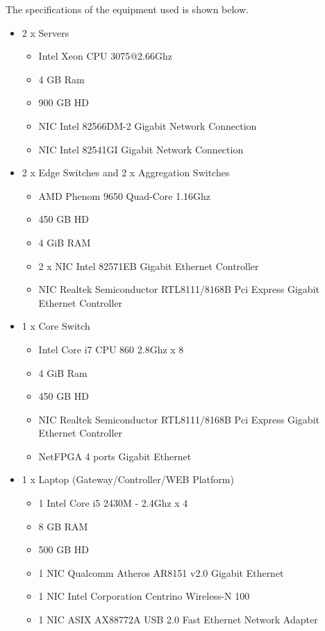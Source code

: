 \documentclass[12pt,english,oneside]{book}
\begin{document}
The specifications of the equipment used is shown below.
\begin{itemize}
  \item 2 x Servers
    \begin{itemize}
      \item Intel Xeon CPU 3075@2.66Ghz
      \item 4 GB Ram
      \item 900 GB HD
      \item NIC Intel 82566DM-2 Gigabit Network Connection
      \item NIC Intel 82541GI Gigabit Network Connection
    \end{itemize}
  \item 2 x Edge Switches and 2 x Aggregation Switches
    \begin{itemize}
      \item AMD Phenom 9650 Quad-Core \@ 1.16Ghz
      \item 450 GB HD
      \item 4 GiB RAM
      \item 2 x NIC Intel 82571EB Gigabit Ethernet Controller
      \item NIC Realtek Semiconductor RTL8111/8168B Pci Express Gigabit Ethernet Controller
    \end{itemize}

    \item 1 x Core Switch
    \begin{itemize}
      \item Intel Core i7 CPU 860 \@ 2.8Ghz x 8 
      \item 4 GiB Ram
      \item 450 GB HD
      \item NIC Realtek Semiconductor RTL8111/8168B Pci Express Gigabit Ethernet Controller
      \item NetFPGA 4 ports Gigabit Ethernet
    \end{itemize}

    \item 1 x Laptop (Gateway/Controller/WEB Platform)
    \begin{itemize}
      \item 1 Intel Core i5 2430M - 2.4Ghz x 4
      \item 8 GB RAM
      \item 500 GB HD
      \item 1 NIC Qualcomm Atheros AR8151 v2.0 Gigabit Ethernet
      \item 1 NIC Intel Corporation Centrino Wireless-N 100
      \item 1 NIC ASIX AX88772A USB 2.0 Fast Ethernet Network Adapter
    \end{itemize}
\end{itemize}
\end{document}
